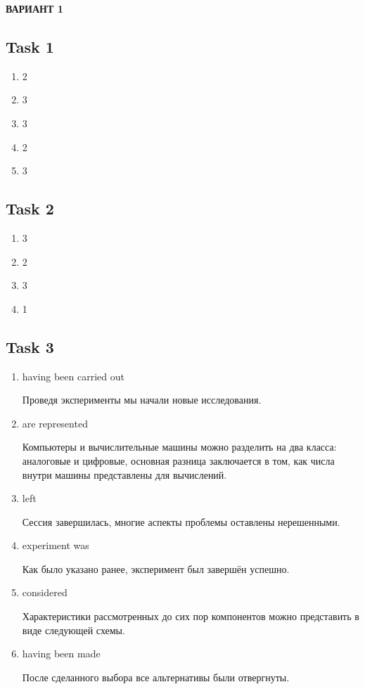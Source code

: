 \begin{center}
	\textbf{ВАРИАНТ 1}
\end{center}

\subsection*{Task 1}

\begin{enumerate}
    \item 2
    \item 3
    \item 3
    \item 2
    \item 3
\end{enumerate}

\subsection*{Task 2}

\begin{enumerate}
    \item 3
    \item 2
    \item 3
    \item 1
\end{enumerate}

\subsection*{Task 3}

\begin{enumerate}
    \item having been carried out
    
    Проведя эксперименты мы начали новые исследования.
    
    \item are represented
    
    Компьютеры и вычислительные машины можно разделить на два класса: аналоговые и цифровые, основная разница заключается в том, как числа внутри машины представлены для вычислений.
    
    \item left
    
    Сессия завершилась, многие аспекты проблемы оставлены нерешенными.
    
    \item experiment was
    
    Как было указано ранее, эксперимент был завершён успешно.
    
    \item considered
    
    Характеристики рассмотренных до сих пор компонентов можно представить в виде следующей схемы.
    
    \item having been made
    
    После сделанного выбора все альтернативы были отвергнуты.
\end{enumerate}

